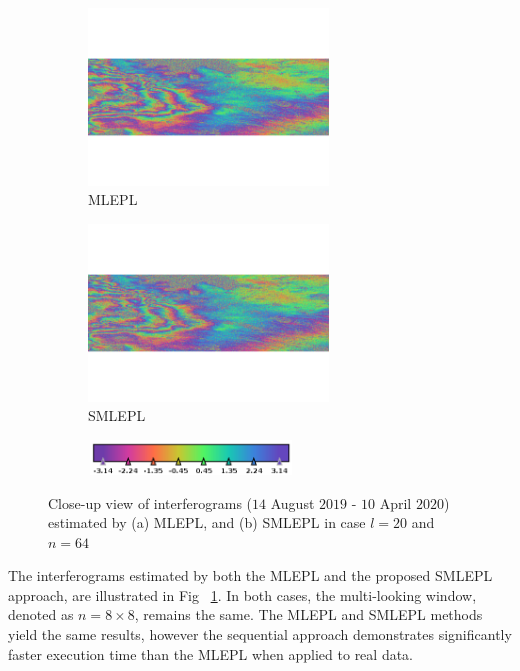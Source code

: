 \begin{figure}[!h]
    \centering
    \begin{subfigure}[b]{\columnwidth}
        \centering
        \includegraphics[trim={0 10cm 0 10cm},clip,width=0.7\textwidth]{./imageandplot/phase_GPL_date_20_crop.png}
        \caption{\ac{MLEPL}}
    \end{subfigure}
    \hfill
    \begin{subfigure}[b]{\columnwidth}
        \centering
        \includegraphics[trim={0 10cm 0 10cm},clip,width=0.7\textwidth]{./imageandplot/phase_sequential_date_20_overlap=4_process=5.png}
        \caption{\acs{SMLEPL}}
    \end{subfigure}
    \hfill
    \begin{subfigure}[b]{\columnwidth}
        \centering
        \includegraphics[width=0.6\textwidth, height=2.5em]{./imageandplot/subset_2_of_sequential_date_20_legend.png}
    \end{subfigure}
    \caption{Close-up view of interferograms ($14$ August $2019$ - $10$ April $2020$) estimated by (a) \ac{MLEPL}, and (b) \acs{SMLEPL} in case $l = 20$ and $n = 64$}
    \label{fig:real_data}
\end{figure}
The interferograms estimated by both the \ac{MLEPL} and the proposed \acs{SMLEPL} approach, are illustrated in Fig ~\ref{fig:real_data}. In both cases, the multi-looking window, denoted as $n = 8 \times 8$, remains the same.  The \ac{MLEPL} and \acs{SMLEPL} methods yield the same results, however the sequential approach demonstrates significantly faster execution time than the \acs{MLEPL} when applied to real data.


